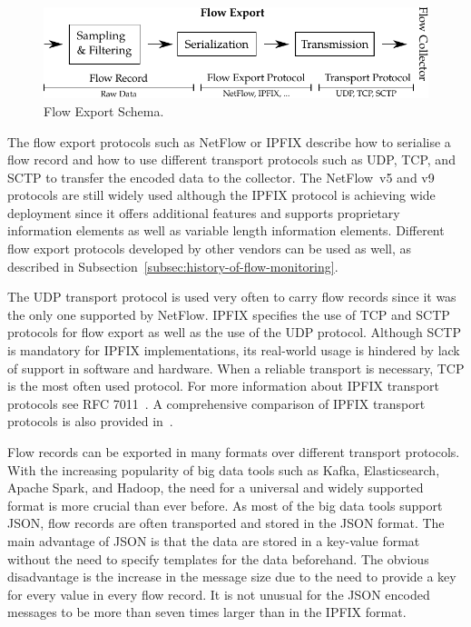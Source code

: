 \begin{figure}[ht!]
  \begin{center}
    \includegraphics{figures/c02/flow-export}
  \end{center}
  \caption{Flow Export Schema.}
  \label{fig:flow-export}
\end{figure}

The flow export protocols such as NetFlow or IPFIX describe how to serialise a flow record and how to use different transport protocols such as UDP, TCP, and SCTP to transfer the encoded data to the collector. The NetFlow~v5 and v9 protocols are still widely used although the IPFIX protocol is achieving wide deployment since it offers additional features and supports proprietary information elements as well as variable length information elements. Different flow export protocols developed by other vendors can be used as well, as described in Subsection~\ref{subsec:history-of-flow-monitoring}.

The UDP transport protocol is used very often to carry flow records since it was the only one supported by NetFlow. IPFIX specifies the use of TCP and SCTP protocols for flow export as well as the use of the UDP protocol. Although SCTP is mandatory for IPFIX implementations, its real-world usage is hindered by lack of support in software and hardware. When a reliable transport is necessary, TCP is the most often used protocol. For more information about IPFIX transport protocols see RFC 7011~\cite{rfc7011}. A comprehensive comparison of IPFIX transport protocols is also provided in~\cite{Hofstede-2014-Flow}.

Flow records can be exported in many formats over different transport protocols. With the increasing popularity of big data tools such as Kafka, Elasticsearch, Apache Spark, and Hadoop, the need for a universal and widely supported format is more crucial than ever before. As most of the big data tools support JSON, flow records are often transported and stored in the JSON format. The main advantage of JSON is that the data are stored in a key-value format without the need to specify templates for the data beforehand. The obvious disadvantage is the increase in the message size due to the need to provide a key for every value in every flow record. It is not unusual for the JSON encoded messages to be more than seven times larger than in the IPFIX format.

